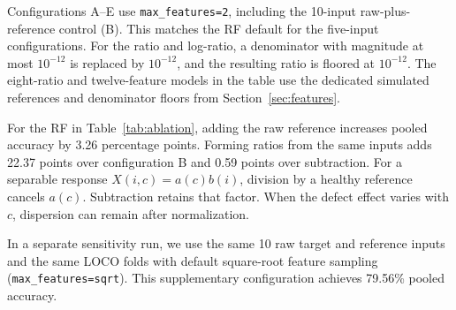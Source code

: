 \documentclass[conference]{IEEEtran}
\begin{document}
Configurations A--E use \texttt{max\_features=2}, including the 10-input raw-plus-reference control (B). This matches the RF default for the five-input configurations. For the ratio and log-ratio, a denominator with magnitude at most $10^{-12}$ is replaced by $10^{-12}$, and the resulting ratio is floored at $10^{-12}$. The eight-ratio and twelve-feature models in the table use the dedicated simulated references and denominator floors from Section~\ref{sec:features}.

\begin{table}[t]
\centering
\caption{Controlled Feature Normalization Ablation Under 45-Corner LOCO}
\label{tab:ablation}
\end{table}

For the RF in Table~\ref{tab:ablation}, adding the raw reference increases pooled accuracy by 3.26 percentage points. Forming ratios from the same inputs adds 22.37 points over configuration B and 0.59 points over subtraction. For a separable response $X(i,c)=a(c)b(i)$, division by a healthy reference cancels $a(c)$. Subtraction retains that factor. When the defect effect varies with $c$, dispersion can remain after normalization.

In a separate sensitivity run, we use the same 10 raw target and reference inputs and the same LOCO folds with default square-root feature sampling (\texttt{max\_features=sqrt}). This supplementary configuration achieves 79.56\% pooled accuracy.
\end{document}
